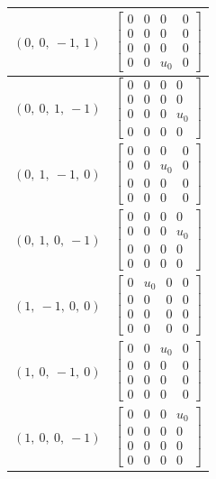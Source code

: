 \documentclass[11pt]{article}
\theoremstyle{definition}
\begin{document}
\begin{tabular}{|l|c|}
    \hline
    $\left( 0, \  0, \  -1, \  1\right)$ & $\left[\begin{matrix}0 & 0 & 0 & 0\\0 & 0 & 0 & 0\\0 & 0 & 0 & 0\\0 & 0 & u_{0} & 0\end{matrix}\right]$ \\
    \hline
    $\left( 0, \  0, \  1, \  -1\right)$ & $\left[\begin{matrix}0 & 0 & 0 & 0\\0 & 0 & 0 & 0\\0 & 0 & 0 & u_{0}\\0 & 0 & 0 & 0\end{matrix}\right]$ \\
    \hline
    $\left( 0, \  1, \  -1, \  0\right)$ & $\left[\begin{matrix}0 & 0 & 0 & 0\\0 & 0 & u_{0} & 0\\0 & 0 & 0 & 0\\0 & 0 & 0 & 0\end{matrix}\right]$ \\
    \hline
    $\left( 0, \  1, \  0, \  -1\right)$ & $\left[\begin{matrix}0 & 0 & 0 & 0\\0 & 0 & 0 & u_{0}\\0 & 0 & 0 & 0\\0 & 0 & 0 & 0\end{matrix}\right]$ \\
    \hline
    $\left( 1, \  -1, \  0, \  0\right)$ & $\left[\begin{matrix}0 & u_{0} & 0 & 0\\0 & 0 & 0 & 0\\0 & 0 & 0 & 0\\0 & 0 & 0 & 0\end{matrix}\right]$ \\
    \hline
    $\left( 1, \  0, \  -1, \  0\right)$ & $\left[\begin{matrix}0 & 0 & u_{0} & 0\\0 & 0 & 0 & 0\\0 & 0 & 0 & 0\\0 & 0 & 0 & 0\end{matrix}\right]$ \\
    \hline
    $\left( 1, \  0, \  0, \  -1\right)$ & $\left[\begin{matrix}0 & 0 & 0 & u_{0}\\0 & 0 & 0 & 0\\0 & 0 & 0 & 0\\0 & 0 & 0 & 0\end{matrix}\right]$ \\
    \hline
\end{tabular}
\end{document}
